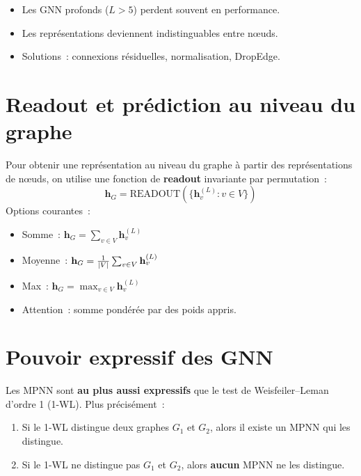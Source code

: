 \begin{attention}[title=\textbf{Cons\'equences pratiques}]
\begin{itemize}
    \item Les GNN profonds ($L > 5$) perdent souvent en performance.
    \item Les repr\'esentations deviennent indistinguables entre n\oe uds.
    \item Solutions~: connexions r\'esiduelles, normalisation, DropEdge.
\end{itemize}
\end{attention}

\section{Readout et pr\'ediction au niveau du graphe}

\begin{definition}[Readout]
Pour obtenir une repr\'esentation au niveau du graphe \`a partir des
repr\'esentations de n\oe uds, on utilise une fonction de \textbf{readout}
invariante par permutation~:
\[
    \mathbf{h}_G = \text{READOUT}(\{\mathbf{h}_v^{(L)} : v \in V\})
\]
Options courantes~:
\begin{itemize}
    \item Somme~: $\mathbf{h}_G = \sum_{v \in V} \mathbf{h}_v^{(L)}$
    \item Moyenne~: $\mathbf{h}_G = \frac{1}{\left| V \right|} \sum_{v \in V} \mathbf{h}_v^{(L)}$
    \item Max~: $\mathbf{h}_G = \max_{v \in V} \mathbf{h}_v^{(L)}$
    \item Attention~: somme pond\'er\'ee par des poids appris.
\end{itemize}
\end{definition}

\section{Pouvoir expressif des GNN}

\begin{theoreme}
Les MPNN sont \textbf{au plus aussi expressifs} que le test de
Weisfeiler--Leman d'ordre 1 (1-WL). Plus pr\'ecis\'ement~:
\begin{enumerate}
    \item Si le 1-WL distingue deux graphes $G_1$ et $G_2$, alors il existe
          un MPNN qui les distingue.
    \item Si le 1-WL ne distingue pas $G_1$ et $G_2$, alors \textbf{aucun}
          MPNN ne les distingue.
\end{enumerate}
\end{theoreme}

